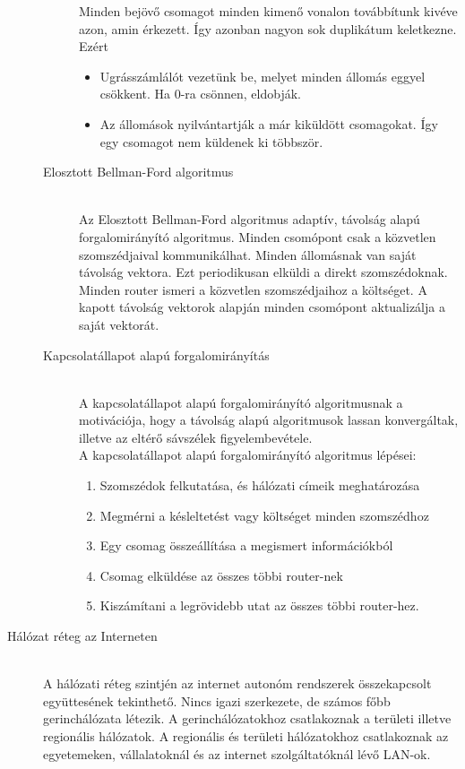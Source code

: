 \documentclass[margin=0px]{article}
\begin{document}
\begin{description}
\begin{description}
                Minden bejövő csomagot minden kimenő vonalon továbbítunk kivéve azon, amin érkezett. Így azonban nagyon sok duplikátum keletkezne. Ezért
                \begin{itemize}
                    \item Ugrásszámlálót vezetünk be, melyet minden állomás eggyel csökkent. Ha 0-ra csönnen, eldobják.
                    \item Az állomások nyilvántartják a már kiküldött csomagokat. Így egy csomagot nem küldenek ki többször.
                \end{itemize}
            \item[Elosztott Bellman-Ford algoritmus] \hfill \\
                Az Elosztott Bellman-Ford algoritmus adaptív, távolság alapú forgalomirányító algoritmus. Minden csomópont csak a közvetlen szomszédjaival kommunikálhat. Minden állomásnak van saját távolság vektora. Ezt periodikusan elküldi a direkt szomszédoknak. Minden router ismeri a közvetlen szomszédjaihoz a költséget. A kapott távolság vektorok alapján minden csomópont aktualizálja a saját vektorát.
            \item[Kapcsolatállapot alapú forgalomirányítás] \hfill \\
                A kapcsolatállapot alapú forgalomirányító algoritmusnak a motivációja, hogy a távolság alapú algoritmusok lassan konvergáltak, illetve az eltérő sávszélek figyelembevétele. \\
                A kapcsolatállapot alapú forgalomirányító algoritmus lépései:
                \begin{enumerate}
                    \item Szomszédok felkutatása, és hálózati címeik meghatározása
                    \item Megmérni a késleltetést vagy költséget minden szomszédhoz
                    \item Egy csomag összeállítása a megismert információkból
                    \item Csomag elküldése az összes többi router-nek
                    \item Kiszámítani a legrövidebb utat az összes többi router-hez.
                \end{enumerate}
        \end{description}
    \item[Hálózat réteg az Interneten] \hfill \\
        A hálózati réteg szintjén az internet autonóm rendszerek összekapcsolt együttesének tekinthető. Nincs igazi szerkezete, de számos főbb gerinchálózata létezik. A gerinchálózatokhoz csatlakoznak a területi illetve regionális hálózatok. A regionális és területi hálózatokhoz csatlakoznak az egyetemeken, vállalatoknál és az internet szolgáltatóknál lévő LAN-ok.


\end{description}
\end{document}
